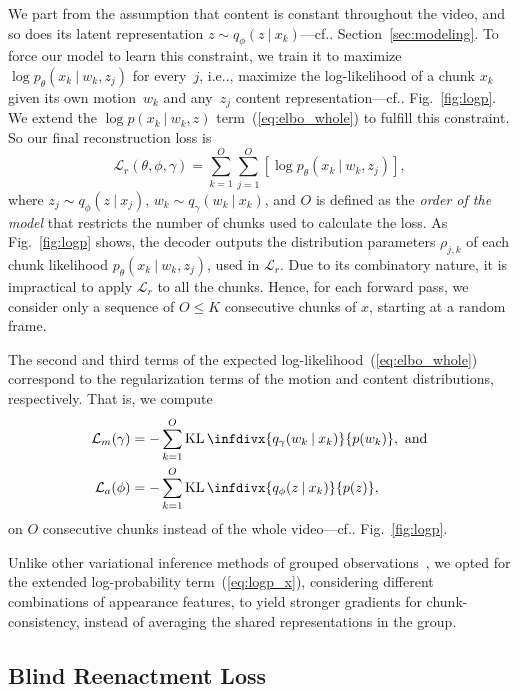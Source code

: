 \documentclass[journal]{IEEEtran}
\makeatletter
\newcommand{\kl}{\operatorname{KL}\infdivx}
\newcommand\givenbase[1][]{\:#1\lvert\:}
\let\given\givenbase
\DeclareRobustCommand\onedot{\futurelet\@let@token\@onedot}
\def\@onedot{\ifx\@let@token.\else.\null\fi\xspace}
\def\ie{{i.e}\onedot} \def\Ie{{I.e}\onedot}
\def\cf{{cf}\onedot} \def\Cf{{Cf}\onedot}
\makeatother
\begin{document}
We part from the assumption that content is constant throughout the video, and so does its latent representation $z \sim q_\phi(z \given x_{k})$---\cf Section~\ref{sec:modeling}.
To force our model to learn this constraint, we train it to maximize $\log p_\theta(x_{k} \given w_k,z_j)$ for every~$j$, \ie, maximize the log-likelihood of a chunk $x_{k}$ given its own motion~$w_k$ and any~$z_j$ content representation---\cf Fig.~\ref{fig:logp}.
We extend the $\log p(x_{k} \given  w_k, z)$ term~(\ref{eq:elbo_whole}) to fulfill this constraint.
So our final reconstruction loss is
\begin{equation}
\label{eq:logp_x}
\mathcal{L}_{r}(\theta, \phi,\gamma) = \sum_{k=1}^O\sum_{j=1}^O \left[\log p_\theta(x_{k} \given w_k,z_j)\right],
\end{equation}
where $z_j \sim q_\phi(z \given x_{j})$, $w_k \sim q_\gamma(w_k \given x_{k})$, and $O$ is defined as the \textit{order of the model} that restricts the number of chunks used to calculate the loss.
As Fig.~\ref{fig:logp} shows, the decoder outputs the distribution parameters $\rho_{j,k}$ of each chunk likelihood $p_\theta(x_{k} \given w_k,z_j)$, used in $\mathcal{L}_{r}$.
Due to its combinatory nature, it is impractical to apply $\mathcal{L}_r$ to all the chunks.
Hence, for each forward pass, we consider only a sequence of $O \le K$ consecutive chunks of $x$, starting at a random frame.

The second and third terms of the expected log-likelihood~(\ref{eq:elbo_whole}) correspond to the regularization terms of the motion and content distributions, respectively.
That is, we compute
\begin{align}
  \label{eq:lm}
  \mathcal{L}_{m}(\gamma)&= -\sum_{k=1}^O \kl{q_\gamma(w_k \given x_k)}{p(w_k)}, \text{ and} \\
  \label{eq:la}
  \mathcal{L}_{a}(\phi)&= -\sum_{k=1}^O \kl{q_\phi(z \given x_k)}{p(z)},
\end{align}
on $O$ consecutive chunks instead of the whole video---\cf Fig.~\ref{fig:logp}.

Unlike other variational inference methods of grouped observations~\cite{Locatello2020,Mathieu2016,Bouchacourt2018,Hosoya2019}, we opted for the extended log-probability term~(\ref{eq:logp_x}), considering different combinations of appearance features, to yield stronger gradients for chunk-consistency, instead of averaging the shared representations in the group.

\subsection{Blind Reenactment Loss}
\label{sec:brl}
\end{document}
